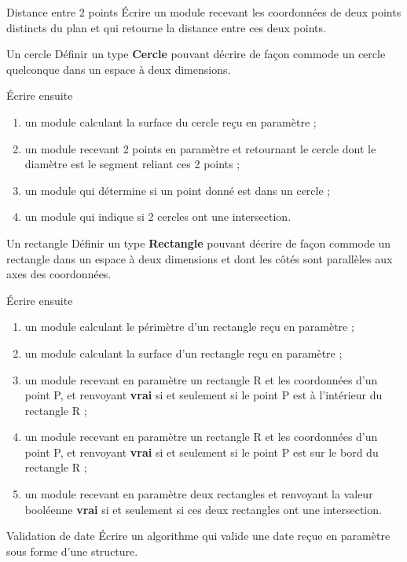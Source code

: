 \begin{Exercice}{Distance entre 2 points}
	Écrire un module recevant les coordonnées de
	deux points distincts du plan et qui retourne
	la distance entre ces deux points.
\end{Exercice}

\begin{Exercice}{Un cercle}
	Définir un type \textbf{Cercle} pouvant décrire de façon
	commode un cercle quelconque dans un espace à deux dimensions. 
	
	Écrire ensuite
	
	\begin{enumerate}[label=\alph*)]
	\item {
		un module calculant la surface du cercle reçu en paramètre ;}
	\item {
		un module recevant 2 points en paramètre et retournant le cercle dont le
		diamètre est le segment reliant ces 2 points ;}
	\item {
		un module qui détermine si un point donné est dans un cercle ;}
	\item {
		un module qui indique si 2 cercles ont une intersection.
	}
	\end{enumerate}
\end{Exercice}


\begin{Exercice}{Un rectangle}
	Définir un type \textbf{Rectangle} pouvant décrire de façon
	commode un rectangle dans un espace à deux dimensions et dont les côtés
	sont parallèles aux axes des coordonnées. 
	
	Écrire ensuite

	\begin{enumerate}[label=\alph*)]
	\item {
		un module calculant le périmètre d’un rectangle reçu en paramètre ;}
	\item {
		un module calculant la surface d’un rectangle reçu en paramètre ;}
	\item {
		un module recevant en paramètre un rectangle R et les coordonnées
		d’un point P, et renvoyant 
		\textbf{vrai} si et seulement si le point P est à
		l’intérieur du rectangle R ;}
	\item {
		un module recevant en paramètre un rectangle R et les coordonnées
		d’un point P, et renvoyant 
		\textbf{vrai} si et seulement si le point P est sur le bord du
		rectangle R ;}
	\item {
		un module recevant en paramètre deux rectangles et renvoyant la valeur
		booléenne \textbf{vrai} si et seulement si ces deux rectangles ont une
		intersection.}
	\end{enumerate}
\end{Exercice}

\begin{Exercice}{Validation de date}
	Écrire un algorithme qui valide une date reçue en paramètre 
	sous forme d’une structure.
\end{Exercice}

	
